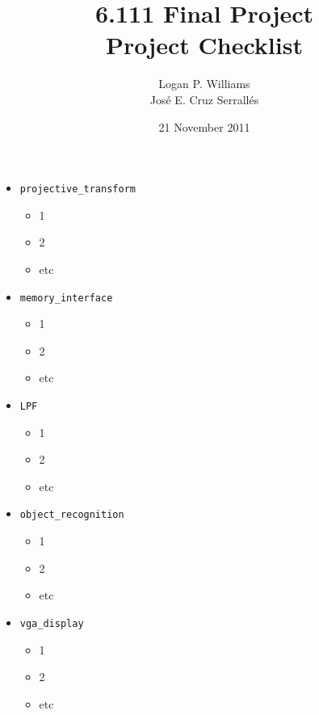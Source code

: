 \documentclass{article}
\title{6.111 Final Project\\Project Checklist}
\date{21 November 2011}
\author{Logan P. Williams\\Jos\'{e} E. Cruz Serrall\'{e}s}
\begin{document}
\maketitle

\begin{Form}
\begin{itemize}
\item[] {\tt projective\_transform}
	\begin{itemize}
	\item 1
	\item 2
	\item etc
	\end{itemize}

\item[] {\tt memory\_interface}
	\begin{itemize}
	\item 1
	\item 2
	\item etc
	\end{itemize}

\item[] {\tt LPF}
	\begin{itemize}
	\item 1
	\item 2
	\item etc
	\end{itemize}

\item[] {\tt object\_recognition}
	\begin{itemize}
	\item 1
	\item 2
	\item etc
	\end{itemize}

\item[] {\tt vga\_display}
	\begin{itemize}
	\item 1
	\item 2
	\item etc
	\end{itemize}

\end{itemize}
\end{Form}
\end{document}

